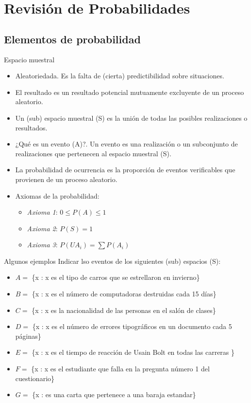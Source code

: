 \section{Revisión de Probabilidades}

\subsection{Elementos de probabilidad}
\begin{frame}{Espacio muestral}
	\begin{itemize}
		\item Aleatoriedada. Es la falta de (cierta) predictibilidad sobre situaciones.
		\item El resultado es un resultado potencial mutuamente excluyente de un proceso aleatorio.
		\item Un (sub) espacio muestral (S) es la unión de todas las posibles realizaciones o resultados.
		\item ¿Qué es un evento (A)?. Un evento es una realización o un subconjunto de realizaciones que pertenecen al espacio muestral (S).
		\item La probabilidad de ocurrencia es la proporción de eventos verificables que provienen de un proceso aleatorio.
		\item Axiomas de la probabilidad:
		\begin{itemize}
			\item \textit{Axioma 1}: $0\leq P(A) \leq 1$
			\item \textit{Axioma 2}: $P(S)=1$
			\item \textit{Axioma 3}: $P(UA_{i}) = \sum P(A_{i})$
		\end{itemize}
	\end{itemize}
\end{frame}
\begin{frame}{Algunos ejemplos}
	Indicar lso eventos de los siguientes (sub) espacios (S):
	{\small
		\begin{itemize}
			\item $A=$ \{x : x es el tipo de carros que se estrellaron en invierno\}
			\item $B=$ \{x : x es el número de computadoras destruidas cada 15 días\}
			\item $C=$ \{x : x es la nacionalidad de las personas en el salón de clases\}
			\item $D=$ \{x : x es el número de errores tipográficos en un documento cada 5 páginas\}
			\item $E=$ \{x : x es el tiempo de reacción de Usain Bolt en todas las carreras \}
			\item $F=$ \{x : x es el estudiante que falla en la pregunta número 1 del cuestionario\}
			\item $G=$ \{x : es una carta que pertenece a una baraja estandar\}
	\end{itemize}}
\end{frame}
